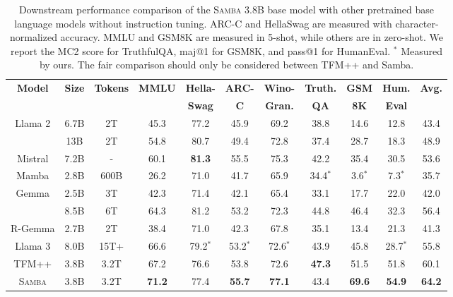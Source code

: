 \documentclass{article}
\begin{document}
\begin{table}[!htp]
\centering
\small
\renewcommand{\arraystretch}{1.1}
\caption{
Downstream performance comparison of the \textsc{Samba} 3.8B base model with other pretrained base language models without instruction tuning. ARC-C and HellaSwag are measured with character-normalized accuracy. MMLU and GSM8K are measured in 5-shot, while others are in zero-shot. We report the MC2 score for TruthfulQA, maj@1 for GSM8K, and pass@1 for HumanEval. $^*$ Measured by ours. The fair comparison should only be considered between TFM++ and Samba.} 
\begin{tabular}{ccc|ccccccc|c}
\toprule
\multirow{2}{*}{\bf Model} & \multirow{2}{*}{\bf Size}  & \multirow{2}{*}{\bf Tokens}  & \multirow{2}{*}{\bf MMLU} & \bf Hella-  & \bf ARC- & \bf Wino- & \bf Truth. & \bf GSM & \bf Hum.  & \bf Avg. \\
& \bf    &  \bf   &   &  \bf Swag  &  \bf C  & \bf Gran.  &  \bf QA & \bf 8K & \bf Eval & \\
\midrule

Llama 2 & 6.7B    &  2T &   45.3  &  77.2 & 45.9  & 69.2   &  38.8 &  14.6 & 12.8 & 43.4 \\
        & 13B    &  2T &  54.8  & 80.7  & 49.4  &  72.8 &  37.4 & 28.7 & 18.3  & 48.9 \\
Mistral & 7.2B  &  - & 60.1  & \bf 81.3  &  55.5 & 75.3  & 42.2 & 35.4 & 30.5  & 53.6 \\
Mamba & 2.8B    &  600B &   26.2  & 71.0   & 41.7   & 65.9  & 34.4$^*$ & 3.6$^*$ & 7.3$^*$ & 35.7 \\
 Gemma & 2.5B    &  3T &   42.3 &  71.4  &  42.1 & 65.4 & 33.1 &  17.7 & 22.0 & 42.0\\
   & 8.5B    &  6T &   64.3 &  81.2  &  53.2 & 72.3 &  44.8 &  46.4 & 32.3 & 56.4 \\
R-Gemma & 2.7B    &  2T &  38.4  &  71.0 &  42.3 & 67.8 & 35.1 & 13.4 & 21.3 & 41.3\\
Llama 3 & 8.0B    &  15T+ &  66.6  &  79.2$^*$ &  53.2$^*$ & 72.6$^*$ & 43.9 & 45.8 & 28.7$^*$ & 55.8\\

\midrule
TFM++ & 3.8B  & 3.2T & 67.2 & 76.6 &  53.8 & 72.6 & \bf 47.3 & 51.5 &  51.8 & 60.1\\
\textsc{Samba} & 3.8B    &  3.2T & \bf 71.2    & 77.4 & \bf  55.7 & \bf 77.1 &  43.4   &  \bf 69.6  & \bf  54.9 & \bf 64.2\\

\bottomrule
\end{tabular}
\label{tab:eval1}
\end{table}
\end{document}
